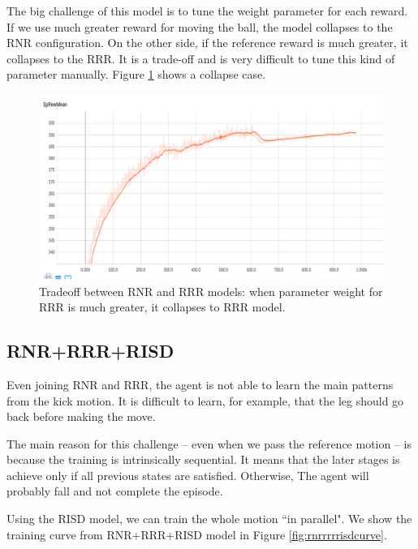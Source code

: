 The big challenge of this model is to tune the weight parameter for each reward. If we use much greater reward for moving the ball, the model collapses to the RNR configuration. On the other side, if the reference reward is much greater, it collapses to the RRR. It is a trade-off and is very difficult to tune this kind of parameter manually. Figure \ref{fig:rnrrrrtradeoff} shows a collapse case.


\begin{figure}[!htbp]
	\centering
	\includegraphics[width=1.0\textwidth]{Cap6/rnrrrrtradeoff.eps}
	\caption{Tradeoff between RNR and RRR models: when parameter weight for RRR is much greater, it collapses to RRR model.}
	\label{fig:rnrrrrtradeoff}
\end{figure}

\subsection{RNR+RRR+RISD}\label{sec:rnrrrrrisd}

Even joining RNR and RRR, the agent is not able to learn the main patterns from the kick motion. It is difficult to learn, for example, that the leg should go back before making the move.

The main reason for this challenge -- even when we pass the reference motion -- is because the training is intrinsically sequential. It means that the later stages is achieve only if all previous states are satisfied. Otherwise, The agent will probably fall and not complete the episode.

Using the RISD model, we can train the whole motion ``in parallel". We show the training curve from RNR+RRR+RISD model in Figure \ref{fig:rnrrrrrisdcurve}. 

